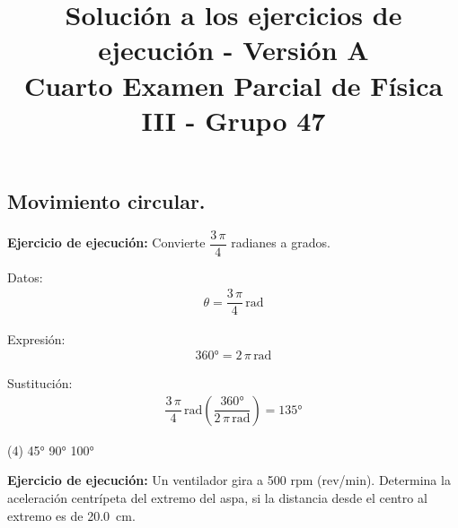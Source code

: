 \documentclass[12pt, letter]{exam}
\date{}
\title{Solución a los ejercicios de ejecución - Versión A \\ Cuarto Examen Parcial de Física III  - Grupo 47}
\begin{document}
\maketitle

\setcounter{page}{2}

\begin{questions}
    \section{Movimiento circular.}

    \setcounter{question}{4} \question \textbf{Ejercicio de ejecución: } Convierte $\dfrac{3 \, \pi}{4}$ radianes a grados.

    \begin{minipage}[t]{0.35\linewidth}
    Datos: 
    \begin{align*}
    \theta = \dfrac{3 \, \pi}{4} \, \unit{\radian}
    \end{align*}
    \end{minipage}
    \hspace{1cm}
    \begin{minipage}[t]{0.4\linewidth}
    Expresión:
    \begin{align*}
    \ang{360} = 2 \, \pi \, \unit{\radian}
    \end{align*}
    \end{minipage}

    Sustitución:
    \begin{align*}
    \dfrac{3 \, \pi}{4} \, \unit{\radian} \left( \dfrac{\ang{360}}{2 \, \pi \, \unit{\radian}} \right) = \ang{135}
    \end{align*}

    \vspace{0.3cm}
    
    \begin{tasks}(4)
        \task \ang{45}
        \task \ang{90}
        \task \ang{100}
        \task {}
    \end{tasks}
    \question \label{Ejercicio_02} \textbf{Ejercicio de ejecución: }  Un ventilador gira a 500 rpm (rev/min). Determina la aceleración centrípeta del extremo del aspa, si la distancia desde el centro al extremo es de \SI{20.0}{\centi\meter}.


\end{questions}
\end{document}
